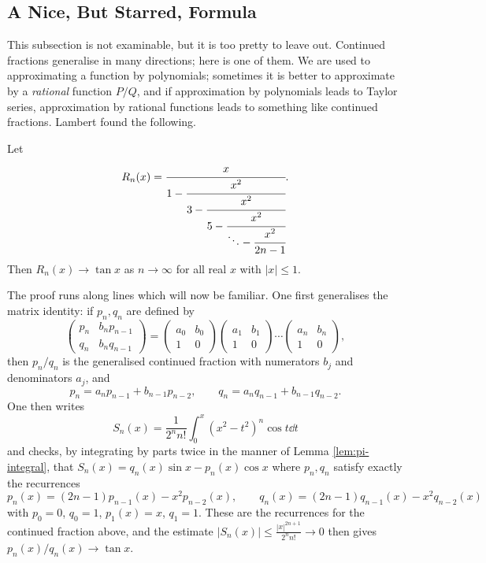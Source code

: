 \subsection*{A Nice, But Starred, Formula}

This subsection is not examinable, but it is too pretty to leave out. Continued fractions generalise in many directions; here is one of them. We are used to approximating a function by polynomials; sometimes it is better to approximate by a \emph{rational} function $P/Q$, and if approximation by polynomials leads to Taylor series, approximation by rational functions leads to something like continued fractions. Lambert found the following.

\begin{theorem}[Lambert]\label{thm:lambert}
	Let
	$$R_n(x) = \cfrac{x}{1-\cfrac{x^2}{3-\cfrac{x^2}{5-\cfrac{x^2}{\ddots-\cfrac{x^2}{2n-1}}}}}.$$
	Then $R_n(x)\to\tan x$ as $n\to\infty$ for all real $x$ with $|x|\leq1$.
\end{theorem}

The proof runs along lines which will now be familiar. One first generalises the matrix identity: if $p_n,q_n$ are defined by
$$\begin{pmatrix}p_n&b_np_{n-1}\\q_n&b_nq_{n-1}\end{pmatrix} = \begin{pmatrix}a_0&b_0\\1&0\end{pmatrix}\begin{pmatrix}a_1&b_1\\1&0\end{pmatrix}\cdots\begin{pmatrix}a_n&b_n\\1&0\end{pmatrix},$$
then $p_n/q_n$ is the generalised continued fraction with numerators $b_j$ and denominators $a_j$, and
$$p_n = a_np_{n-1}+b_{n-1}p_{n-2}, \qquad q_n = a_nq_{n-1}+b_{n-1}q_{n-2}.$$
One then writes
$$S_n(x) = \frac{1}{2^nn!}\int_0^x(x^2-t^2)^n\cos t\dd t$$
and checks, by integrating by parts twice in the manner of Lemma \ref{lem:pi-integral}, that $S_n(x) = q_n(x)\sin x - p_n(x)\cos x$ where $p_n,q_n$ satisfy exactly the recurrences
$$p_n(x) = (2n-1)p_{n-1}(x)-x^2p_{n-2}(x),\qquad q_n(x) = (2n-1)q_{n-1}(x)-x^2q_{n-2}(x)$$
with $p_0=0$, $q_0=1$, $p_1(x)=x$, $q_1=1$. These are the recurrences for the continued fraction above, and the estimate $|S_n(x)|\leq\frac{|x|^{2n+1}}{2^nn!}\to0$ then gives $p_n(x)/q_n(x)\to\tan x$.

